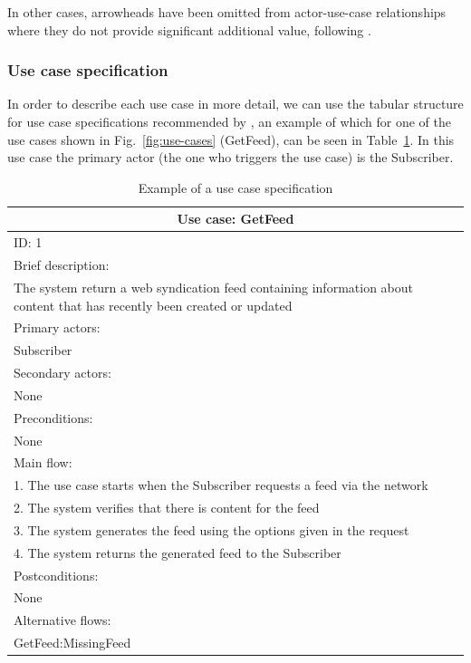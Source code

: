\documentclass[runningheads,a4paper]{llncs}
\begin{document}
In other cases, arrowheads have been omitted from actor-use-case relationships where they do not provide significant additional value, following \cite{ambler}.

\subsubsection{Use case specification}

In order to describe each use case in more detail, we can use the tabular structure for use case specifications recommended by \cite{arlow}, an example of which for one of the use cases shown in Fig.~\ref{fig:use-cases} (\textsf{GetFeed}), can be seen in Table~\ref{tab:use-case-detail}. In this use case the primary actor (the one who triggers the use case) is the \textsf{Subscriber}. 

\begin{table}[t]
\begin{center}
\begin{tabular}{ | p{\textwidth} |}
\hline
\multicolumn{1}{|c|}{Use case: GetFeed} \\
\hline
ID: 1 \\
\hline
Brief description: \\
The system return a web syndication feed containing information about content that has recently been created or updated \\
\hline
Primary actors: \\
Subscriber \\
\hline
Secondary actors: \\
None \\
\hline
Preconditions: \\
None \\
\hline
Main flow: \\
1. The use case starts when the Subscriber requests a feed via the network \\
2. The system verifies that there is content for the feed \\
3. The system generates the feed using the options given in the request \\
4. The system returns the generated feed to the Subscriber \\
\hline
Postconditions: \\
None \\
\hline
Alternative flows: \\
GetFeed:MissingFeed \\
\hline
\end{tabular}
\end{center}
\caption{Example of a use case specification}
\label{tab:use-case-detail}
\end{table}
\end{document}
